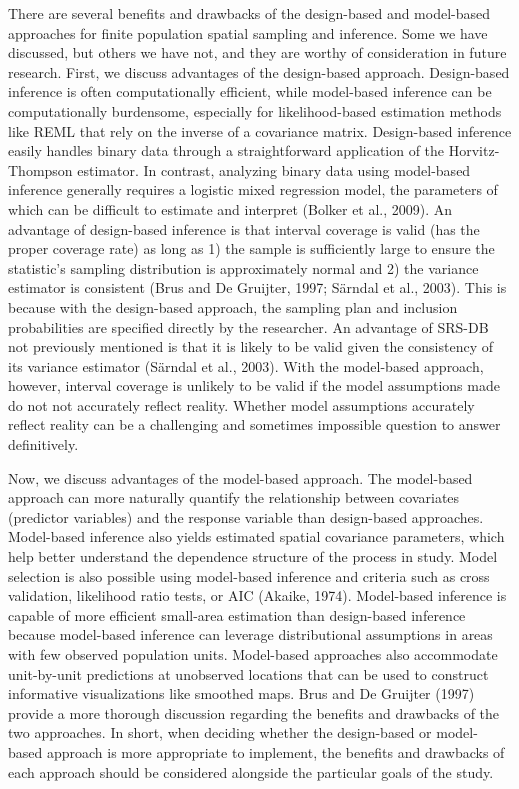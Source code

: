 \documentclass[]{elsarticle} %
\begin{document}
There are several benefits and drawbacks of the design-based and
model-based approaches for finite population spatial sampling and
inference. Some we have discussed, but others we have not, and they are
worthy of consideration in future research. First, we discuss advantages
of the design-based approach. Design-based inference is often
computationally efficient, while model-based inference can be
computationally burdensome, especially for likelihood-based estimation
methods like REML that rely on the inverse of a covariance matrix.
Design-based inference easily handles binary data through a
straightforward application of the Horvitz-Thompson estimator. In
contrast, analyzing binary data using model-based inference generally
requires a logistic mixed regression model, the parameters of which can
be difficult to estimate and interpret (Bolker et al., 2009). An
advantage of design-based inference is that interval coverage is valid
(has the proper coverage rate) as long as 1) the sample is sufficiently
large to ensure the statistic's sampling distribution is approximately
normal and 2) the variance estimator is consistent (Brus and De
Gruijter, 1997; Särndal et al., 2003). This is because with the
design-based approach, the sampling plan and inclusion probabilities are
specified directly by the researcher. An advantage of SRS-DB not
previously mentioned is that it is likely to be valid given the
consistency of its variance estimator (Särndal et al., 2003). With the
model-based approach, however, interval coverage is unlikely to be valid
if the model assumptions made do not not accurately reflect reality.
Whether model assumptions accurately reflect reality can be a
challenging and sometimes impossible question to answer definitively.

Now, we discuss advantages of the model-based approach. The model-based
approach can more naturally quantify the relationship between covariates
(predictor variables) and the response variable than design-based
approaches. Model-based inference also yields estimated spatial
covariance parameters, which help better understand the dependence
structure of the process in study. Model selection is also possible
using model-based inference and criteria such as cross validation,
likelihood ratio tests, or AIC (Akaike, 1974). Model-based inference is
capable of more efficient small-area estimation than design-based
inference because model-based inference can leverage distributional
assumptions in areas with few observed population units. Model-based
approaches also accommodate unit-by-unit predictions at unobserved
locations that can be used to construct informative visualizations like
smoothed maps. Brus and De Gruijter (1997) provide a more thorough
discussion regarding the benefits and drawbacks of the two approaches.
In short, when deciding whether the design-based or model-based approach
is more appropriate to implement, the benefits and drawbacks of each
approach should be considered alongside the particular goals of the
study.
\end{document}
